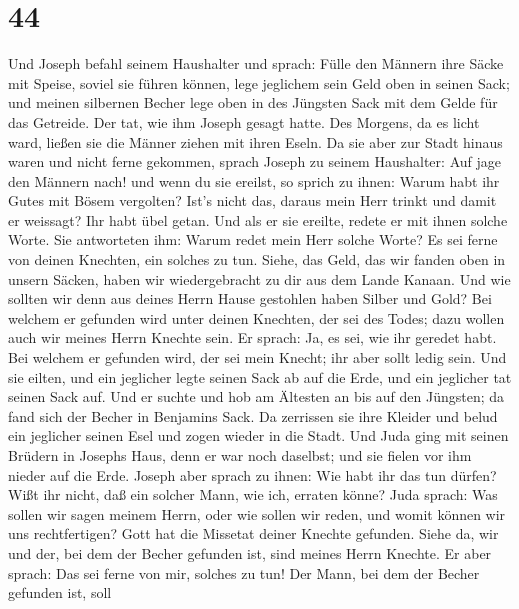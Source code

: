 \hypertarget{section-43}{%
\section{44}\label{section-43}}

 Und Joseph befahl seinem Haushalter und sprach: Fülle den
Männern ihre Säcke mit Speise, soviel sie führen können, lege jeglichem
sein Geld oben in seinen Sack;  und meinen silbernen Becher
lege oben in des Jüngsten Sack mit dem Gelde für das Getreide. Der tat,
wie ihm Joseph gesagt hatte.  Des Morgens, da es licht ward,
ließen sie die Männer ziehen mit ihren Eseln.  Da sie aber
zur Stadt hinaus waren und nicht ferne gekommen, sprach Joseph zu seinem
Haushalter: Auf jage den Männern nach! und wenn du sie ereilst, so
sprich zu ihnen: Warum habt ihr Gutes mit Bösem vergolten? 
Ist's nicht das, daraus mein Herr trinkt und damit er weissagt? Ihr habt
übel getan.  Und als er sie ereilte, redete er mit ihnen
solche Worte.  Sie antworteten ihm: Warum redet mein Herr
solche Worte? Es sei ferne von deinen Knechten, ein solches zu tun.
 Siehe, das Geld, das wir fanden oben in unsern Säcken,
haben wir wiedergebracht zu dir aus dem Lande Kanaan. Und wie sollten
wir denn aus deines Herrn Hause gestohlen haben Silber und Gold?
 Bei welchem er gefunden wird unter deinen Knechten, der sei
des Todes; dazu wollen auch wir meines Herrn Knechte sein. 
Er sprach: Ja, es sei, wie ihr geredet habt. Bei welchem er gefunden
wird, der sei mein Knecht; ihr aber sollt ledig sein.  Und
sie eilten, und ein jeglicher legte seinen Sack ab auf die Erde, und ein
jeglicher tat seinen Sack auf.  Und er suchte und hob am
Ältesten an bis auf den Jüngsten; da fand sich der Becher in Benjamins
Sack.  Da zerrissen sie ihre Kleider und belud ein
jeglicher seinen Esel und zogen wieder in die Stadt.  Und
Juda ging mit seinen Brüdern in Josephs Haus, denn er war noch daselbst;
und sie fielen vor ihm nieder auf die Erde.  Joseph aber
sprach zu ihnen: Wie habt ihr das tun dürfen? Wißt ihr nicht, daß ein
solcher Mann, wie ich, erraten könne?  Juda sprach: Was
sollen wir sagen meinem Herrn, oder wie sollen wir reden, und womit
können wir uns rechtfertigen? Gott hat die Missetat deiner Knechte
gefunden. Siehe da, wir und der, bei dem der Becher gefunden ist, sind
meines Herrn Knechte.  Er aber sprach: Das sei ferne von
mir, solches zu tun! Der Mann, bei dem der Becher gefunden ist, soll
